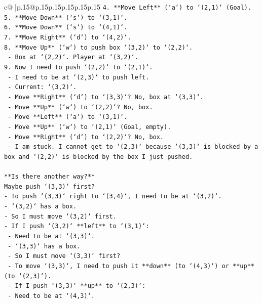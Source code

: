 \documentclass{article}
\begin{document}
{\begin{supertabular}{c@{$\;$}|p{.15\linewidth}@{}p{.15\linewidth}p{.15\linewidth}p{.15\linewidth}p{.15\linewidth}p{.15\linewidth}}
{{{\texttt{4. **Move Left** (`a`) to `(2,1)` (Goal).} \\
\texttt{5. **Move Down** (`s`) to `(3,1)`.} \\
\texttt{6. **Move Down** (`s`) to `(4,1)`.} \\
\texttt{7. **Move Right** (`d`) to `(4,2)`.} \\
\texttt{8. **Move Up** (`w`) to push box `(3,2)` to `(2,2)`.} \\
\texttt{   {-} Box at `(2,2)`. Player at `(3,2)`.} \\
\texttt{9. Now I need to push `(2,2)` to `(2,1)`.} \\
\texttt{   {-} I need to be at `(2,3)` to push left.} \\
\texttt{   {-} Current: `(3,2)`.} \\
\texttt{   {-} Move **Right** (`d`) to `(3,3)`? No, box at `(3,3)`.} \\
\texttt{   {-} Move **Up** (`w`) to `(2,2)`? No, box.} \\
\texttt{   {-} Move **Left** (`a`) to `(3,1)`.} \\
\texttt{   {-} Move **Up** (`w`) to `(2,1)` (Goal, empty).} \\
\texttt{   {-} Move **Right** (`d`) to `(2,2)`? No, box.} \\
\texttt{   {-} I am stuck. I cannot get to `(2,3)` because `(3,3)` is blocked by a box and `(2,2)` is blocked by the box I just pushed.} \\
\\ 
\texttt{**Is there another way?**} \\
\texttt{Maybe push `(3,3)` first?} \\
\texttt{{-} To push `(3,3)` right to `(3,4)`, I need to be at `(3,2)`.} \\
\texttt{{-} `(3,2)` has a box.} \\
\texttt{{-} So I must move `(3,2)` first.} \\
\texttt{{-} If I push `(3,2)` **left** to `(3,1)`:} \\
\texttt{  {-} Need to be at `(3,3)`.} \\
\texttt{  {-} `(3,3)` has a box.} \\
\texttt{  {-} So I must move `(3,3)` first?} \\
\texttt{  {-} To move `(3,3)`, I need to push it **down** (to `(4,3)`) or **up** (to `(2,3)`).} \\
\texttt{  {-} If I push `(3,3)` **up** to `(2,3)`:} \\
\texttt{    {-} Need to be at `(4,3)`.} \\
}}}
\end{supertabular}}
\end{document}
